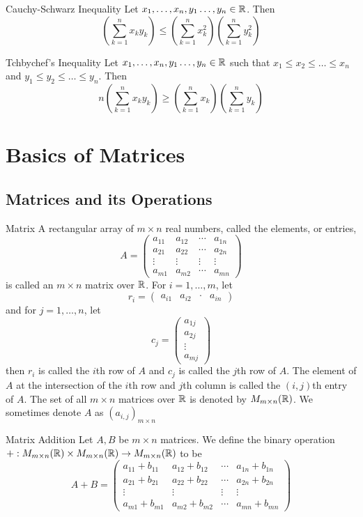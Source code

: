 \documentclass[a4paper]{article}
\begin{document}
\begin{thm}{Cauchy-Schwarz Inequality}{} Let $x_1,\dots,x_n,y_1\dots,y_n\in\mathbb{R}$. Then $$\left(\sum_{k=1}^nx_ky_k\right)\leq\left(\sum_{k=1}^nx_k^2\right)\left(\sum_{k=1}^ny_k^2\right)$$
\end{thm}

\begin{thm}{Tchbychef's Inequality}{} Let $x_1,\dots,x_n,y_1\dots,y_n\in\mathbb{R}$ such that $x_1\leq x_2\leq\dots\leq x_n$ and $y_1\leq y_2\leq\dots\leq y_n$. Then $$n\left(\sum_{k=1}^n x_ky_k\right)\geq\left(\sum_{k=1}^nx_k\right)\left(\sum_{k=1}^ny_k\right)$$
\end{thm}

\pagebreak
\section{Basics of Matrices}
\subsection{Matrices and its Operations}
\begin{defn}{Matrix}{} A rectangular array of $m\times n$ real numbers, called the elements, or entries, $$A=
\begin{pmatrix}
a_{11}&a_{12}&\cdots&a_{1n}\\
a_{21}&a_{22}&\cdots&a_{2n}\\
\vdots&\vdots&\vdots&\vdots\\
a_{m1}&a_{m2}&\cdots&a_{mn}
\end{pmatrix}$$ is called an $m\times n$ matrix over $\mathbb{R}$. For $i=1,\dots,m$, let $$r_i=
\begin{pmatrix}
a_{i1}&a_{i2}&\cdot&a_{in}
\end{pmatrix}$$ and for $j=1,\dots,n$, let $$c_j=
\begin{pmatrix}
a_{1j}\\
a_{2j}\\
\vdots\\
a_{mj}
\end{pmatrix}$$ then $r_i$ is called the $i$th row of $A$ and $c_j$ is called the $j$th row of $A$. The element of $A$ at the intersection of the $i$th row and $j$th column is called the $(i,j)$th entry of $A$. The set of all $m\times n$ matrices over $\mathbb{R}$ is denoted by $M_{m\times n}(\mathbb{R})$. We sometimes denote $A$ as $(a_{i,j})_{m\times n}$
\end{defn}

\begin{defn}{Matrix Addition}{} Let $A,B$ be $m\times n$ matrices. We define the binary operation $+:M_{m\times n}(\mathbb{R})\times M_{m\times n}(\mathbb{R})\to M_{m\times n}(\mathbb{R})$ to be $$A+B=
\begin{pmatrix}
a_{11}+b_{11}&a_{12}+b_{12}&\cdots&a_{1n}+b_{1n}\\
a_{21}+b_{21}&a_{22}+b_{22}&\cdots&a_{2n}+b_{2n}\\
\vdots&\vdots&\vdots&\vdots\\
a_{m1}+b_{m1}&a_{m2}+b_{m2}&\cdots&a_{mn}+b_{mn}
\end{pmatrix}$$
\end{defn}
\end{document}
